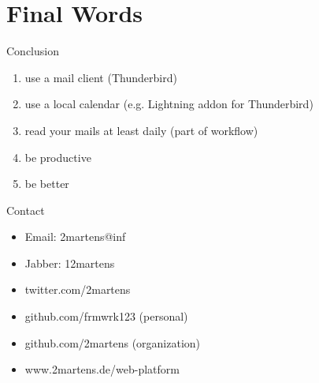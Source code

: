 \documentclass{beamer}
\begin{document}
	\section*{Final Words}
	\begin{frame}{Conclusion}
		\begin{enumerate}
			\item<1-> use a mail client (Thunderbird)
			\item<2-> use a local calendar (e.g. Lightning addon for Thunderbird)
			\item<3-> read your mails at least daily (part of workflow)
			\item<4-> be productive
			\item<5> be better
		\end{enumerate}
	\end{frame}
	\begin{frame}{Contact}
		\begin{itemize}
			\item Email: 2martens@inf
			\item Jabber: 12martens
			\item twitter.com/2martens
			\item github.com/frmwrk123 (personal)
			\item github.com/2martens (organization)
			\item www.2martens.de/web-platform
		\end{itemize}
	\end{frame}
\end{document}
